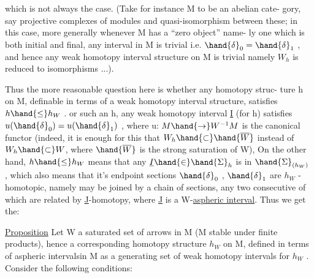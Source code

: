 
which is not always the case. (Take for instance M to be an abelian cate-%
gory,  say projective complexes of modules and quasi-isomorphism between
these;  in this case,  more generally whenever M has a ``zero object'' name-%
ly one which is both initial and final,  any interval in M is trivial i.e.
$\hand{\delta}_0=\hand{\delta}_1$ ,  and hence  any weak homotopy interval structure
on M is trivial namely $W_h$ is reduced to isomorphisms ...).

Thus the more reasonable question here is whether any homotopy struc-%
ture h on M,  definable in terms of a weak homotopy interval structure,
 
satisfies $h\hand{\leq}h_W$ . or such an h,  any weak homotopy interval \underline{I} (for  h)
 satisfies  $u(\hand{\delta}_0)=u(\hand{\delta}_1)$ ,  where u: $M\hand{\rightarrow}W^{-1}M$  is the canonical
functor  (indeed,  it is enough  for this that  $W_h\hand{\subset}\hand{\overline{W}}$  instead
of $W_h\hand{\subset}W$,  where $\hand{\overline{W}}$ is the strong saturation of W),  
On the other hand,  $h\hand{\leq}h_W$ means that  any $\underline{I}\hand{\in}\hand{\Sigma}_h$ is in $\hand{\Sigma}_{(h_W)}$ , which \margin{$\times$}
also means that it's endpoint  sections $\hand{\delta}_0$ , $\hand{\delta}_1$ are  $h_W$ -homotopic,
namely may be joined by a chain of sections,  any two consecutive of
which are related by  \underline{J}-homotopy,  where \underline{J} is a W-\uline{aspheric interval}.
Thus we get the:

\uline{Proposition}  Let W a saturated set of arrows in M (M stable under finite
products),  hence a corresponding homotopy structure $h_W$ on M,  defined in
terms of aspheric intervals\hand{*}in M as a generating set of weak homotopy 
intervals for $h_W$ .   Consider the following conditions:

